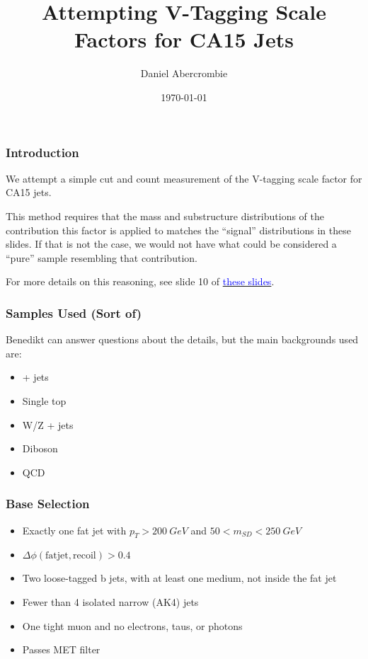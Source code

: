 \documentclass{beamer}
\author[D. Abercrombie]{
  Daniel Abercrombie
}
\title{\bf \sffamily Attempting V-Tagging Scale Factors for CA15 Jets}
\date{\today}
\begin{document}
\begin{frame}[nonumbering]
  \titlepage
\end{frame}

\begin{frame}
  \frametitle{Introduction}

  We attempt a simple cut and count measurement of the V-tagging scale factor for CA15 jets.

  \vspace{12pt}

  This method requires that the mass and substructure distributions of the contribution this factor is applied to
  matches the ``signal'' distributions in these slides.
  If that is not the case, we would not have what could be considered a ``pure'' sample resembling that contribution.

  \vspace{12pt}

  For more details on this reasoning, see slide 10 of
  \href{http://t3serv001.mit.edu/~dabercro/docs/WTagStudy/dabercro_WTagStudy_160727.pdf}
       {\textcolor{blue}{these slides}}.

\end{frame}

\begin{frame}
  \frametitle{Samples Used (Sort of)}

  Benedikt can answer questions about the details, but the main backgrounds used are:

  \begin{itemize}
  \item \ttbar + jets
  \item Single top
  \item W/Z + jets
  \item Diboson
  \item QCD
  \end{itemize}

\end{frame}

\begin{frame}
  \frametitle{Base Selection}

  \begin{itemize}
  \item Exactly one fat jet with $p_T > \SI{200}{GeV}$ and $50 < m_{SD} < \SI{250}{GeV}$
  \item $\Delta\phi\mathrm{(fat jet, recoil)} > 0.4$
  \item Two loose-tagged b jets, with at least one medium, not inside the fat jet
  \item Fewer than 4 isolated narrow (AK4) jets
  \item One tight muon and no electrons, taus, or photons
  \item Passes MET filter
  \end{itemize}

\end{frame}
\end{document}
